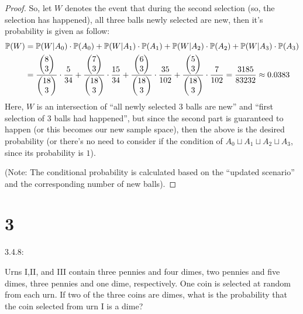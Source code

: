 \documentclass{article}
\begin{document}
\begin{proof}
    So, let $W$ denotes the event that during the second selection (so, the selection has happened), all three balls newly selected are new, then it's probability is given as follow:
    \begin{align}
        \mathbb{P}(W)&=\mathbb{P}(W|A_0)\cdot \mathbb{P}(A_0)+\mathbb{P}(W|A_1)\cdot \mathbb{P}(A_1)+\mathbb{P}(W|A_2)\cdot \mathbb{P}(A_2)+\mathbb{P}(W|A_3)\cdot \mathbb{P}(A_3)\\
        &= \frac{\begin{pmatrix}8\\3\end{pmatrix}}{\begin{pmatrix}18\\3\end{pmatrix}}\cdot \frac{5}{34}+\frac{\begin{pmatrix}7\\3\end{pmatrix}}{\begin{pmatrix}18\\3\end{pmatrix}}\cdot \frac{15}{34}+\frac{\begin{pmatrix}6\\3\end{pmatrix}}{\begin{pmatrix}18\\3\end{pmatrix}}\cdot\frac{35}{102}+\frac{\begin{pmatrix}5\\3\end{pmatrix}}{\begin{pmatrix}18\\3\end{pmatrix}}\cdot\frac{7}{102} = \frac{3185}{83232}\approx 0.0383
    \end{align}
    Here, $W$ is an intersection of ``all newly selected 3 balls are new'' and ``first selection of 3 balls had happened'', but since the second part is guaranteed to happen (or this becomes our new sample space), then the above is the desired probability (or there's no need to consider if the condition of $A_0\sqcup A_1\sqcup A_2\sqcup A_3$, since its probability is $1$).

    (Note: The conditional probability is calculated based on the ``updated scenario'' and the corresponding number of new balls).
\end{proof}

\newpage
\section*{3}
\begin{ques}\label{q3}
    3.4.8:

    Urns I,II, and III contain three pennies and four dimes, two pennies and five dimes, three pennies and one dime, respectively. One coin is selected at random from each urn. If two of the three coins are dimes, what is the probability that the coin selected from urn I is a dime?
\end{ques}
\end{document}
